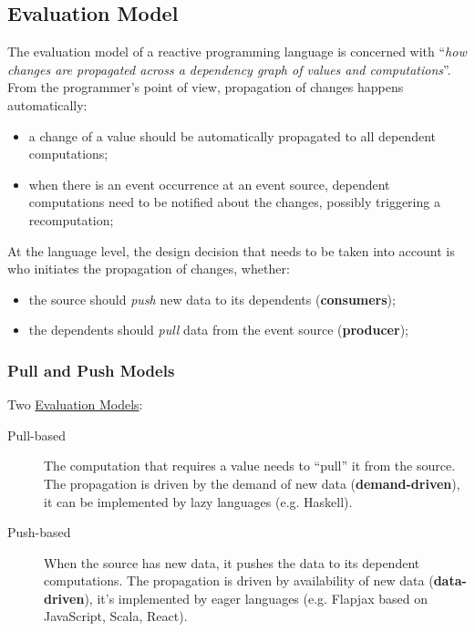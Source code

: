 \subsection{Evaluation Model}\label{sub:rp_evaluation_model} %
The evaluation model of a reactive programming language is concerned with ``\textit{how changes are propagated across a dependency graph of values and computations}''.
From the programmer's point of view, propagation of changes happens automatically:
\begin{itemize}
    \item a change of a value should be automatically propagated to all dependent computations;
    \item when there is an event occurrence at an event source, dependent computations need to be notified about the changes, possibly triggering a recomputation;
\end{itemize}
At the language level, the design decision that needs to be taken into account is who initiates the propagation of changes, whether:
\begin{itemize}
    \item the source should \textit{push} new data to its dependents (\textbf{consumers});
    \item the dependents should \textit{pull} data from the event source (\textbf{producer});
\end{itemize}
%
\subsubsection{Pull and Push Models}\label{sub:rp_pull_and_push_models} %
Two \hyperref[sub:rp_evaluation_model]{Evaluation Models}:
\begin{description}
    \item[Pull-based] The computation that requires a value needs to ``pull'' it from the source.
        The propagation is driven by the demand of new data (\textbf{demand-driven}), it can be implemented by lazy languages (e.g. Haskell).
    \item[Push-based] When the source has new data, it pushes the data to its dependent computations.
        The propagation is driven by availability of new data (\textbf{data-driven}), it's implemented by eager languages (e.g. Flapjax based on JavaScript, Scala, React).
\end{description}
%
